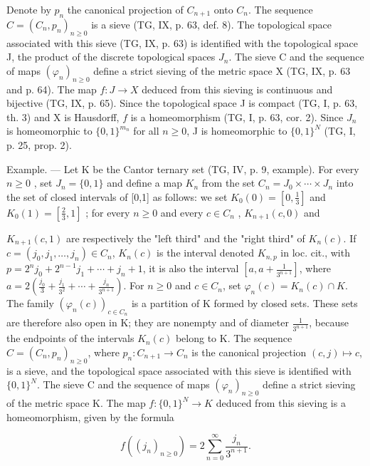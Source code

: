 Denote by \(p_n\) the canonical projection of \(C_{n+1}\) onto \(C_n\). The sequence \(C = (C_n, p_n)_{n \geqslant 0}\) is a sieve (TG, IX, p. 63, def. 8). The topological space associated with this sieve (TG, IX, p. 63) is identified with the topological space J, the product of the discrete topological spaces \(J_n\). The sieve C and the sequence of maps \((\varphi_n)_{n \geqslant 0}\) define a strict sieving of the metric space X (TG, IX, p. 63 and p. 64). The map \(f: J \to X\) deduced from this sieving is continuous and bijective (TG, IX, p. 65). Since the topological space J is compact (TG, I, p. 63, th. 3) and X is Hausdorff, \(f\) is a homeomorphism (TG, I, p. 63, cor. 2). Since \(J_n\) is homeomorphic to \(\{0, 1\}^{m_n}\) for all \(n \geqslant 0\), J is homeomorphic to \(\{0, 1\}^N\) (TG, I, p. 25, prop. 2).

Example. --- Let K be the Cantor ternary set (TG, IV, p. 9, example). For every \(n \geqslant 0\) , set \(J_{n} = \{0,1\}\) and define a map \(K_{n}\) from the set \(C_{n} = J_{0} \times \cdots \times J_{n}\) into the set of closed intervals of {[}0,1{]} as follows: we set \(K_{0}(0) = [0, \frac{1}{3}]\) and \(K_{0}(1) = [\frac{2}{3}, 1]\) ; for every \(n \geqslant 0\) and every \(c \in C_{n}\) , \(K_{n+1}(c,0)\) and

\(K_{n+1}(c,1)\) are respectively the "left third" and the "right third" of \(K_n(c)\). If \(c = (j_0,j_1,\ldots,j_n) \in C_n\), \(K_n(c)\) is the interval denoted \(K_{n,p}\) in loc. cit., with \(p = 2^n j_0 + 2^{n-1}j_1 + \cdots + j_n + 1\), it is also the interval \([a,a + \frac{1}{3^{n+1}}]\), where \(a = 2(\frac{j_0}{3} + \frac{j_1}{3^2} + \cdots + \frac{j_n}{3^{n+1}})\). For \(n \geqslant 0\) and \(c \in C_n\), set \(\varphi_n(c) = K_n(c) \cap K\). The family \((\varphi_n(c))_{c \in C_n}\) is a partition of K formed by closed sets. These sets are therefore also open in K; they are nonempty and of diameter \(\frac{1}{3^{n+1}}\), because the endpoints of the intervals \(K_n(c)\) belong to K. The sequence \(C = (C_n, p_n)_{n \geqslant 0}\), where \(p_n: C_{n+1} \to C_n\) is the canonical projection \((c,j) \mapsto c\), is a sieve, and the topological space associated with this sieve is identified with \(\{0,1\}^N\). The sieve C and the sequence of maps \((\varphi_n)_{n \geqslant 0}\) define a strict sieving of the metric space K. The map \(f: \{0,1\}^N \to K\) deduced from this sieving is a homeomorphism, given by the formula

\[
f ((j _ {n}) _ {n \geqslant 0}) = 2 \sum_ {n = 0} ^ {\infty} \frac {j _ {n}}{3 ^ {n + 1}}.
\]

